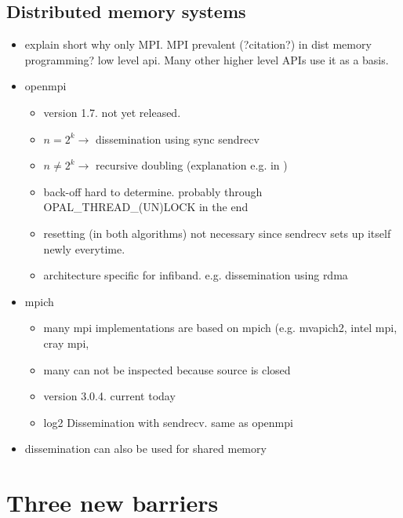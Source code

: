 \documentclass[a4paper, 10pt]{article}
\begin{document}
\subsection{Distributed memory systems}
\begin{itemize}
	\item explain short why only MPI. MPI prevalent (?citation?) in dist memory programming? low level api. Many other higher level APIs use it as a basis.
	\item openmpi
		\begin{itemize}
			\item version 1.7. not yet released.
			\item $n = 2^k \rightarrow$ dissemination\cite{hensgen1988} using sync sendrecv
			\item $n \neq 2^k \rightarrow$ recursive doubling (explanation e.g. in \cite{hoefler2006})
			\item back-off hard to determine. probably through OPAL\_THREAD\_(UN)LOCK in the end
			\item resetting (in both algorithms) not necessary since sendrecv sets up itself newly everytime.
			\item architecture specific for infiband. e.g. dissemination using rdma \cite{hoefler2006}
		\end{itemize}
	\item mpich
		\begin{itemize}
			\item many mpi implementations are based on mpich (e.g. mvapich2, intel mpi, cray mpi,
			\item many can not be inspected because source is closed
			\item version 3.0.4. current today
			\item log2 Dissemination with sendrecv. same as openmpi
		\end{itemize}
	\item dissemination can also be used for shared memory\cite{hoefler2013}
\end{itemize}

\section{Three new barriers}
\end{document}
